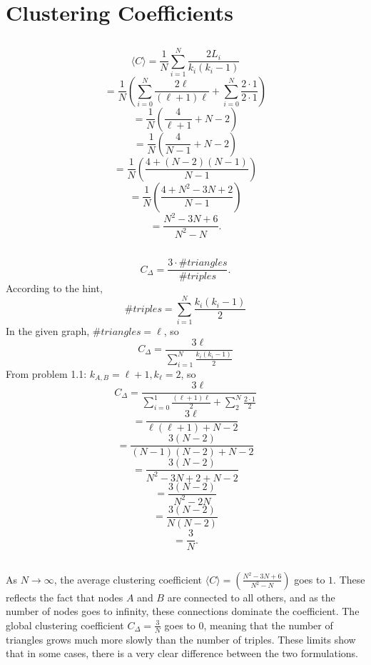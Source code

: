 \documentclass {article}
\begin{document}
\section{Clustering Coefficients}
\subsection{}

$$ \langle C \rangle
= \frac{ 1 }{ N } \sum\limits_{ i=1 }^N \frac{ 2 L_i }{ k_i (k_i - 1) } $$
$$ = \frac{ 1 }{ N } (\sum\limits_{ i=0 }^N \frac{ 2 \ell }{ (\ell + 1) \ell } + \sum\limits_{ i=0 }^N \frac{ 2 \cdot 1 }{ 2 \cdot 1 }) $$
$$ = \frac{ 1 }{ N } (\frac{ 4 }{ \ell + 1 } + N - 2 ) $$
$$ = \frac{ 1 }{ N } (\frac{ 4 }{ N - 1 } + N - 2 ) $$
$$ = \frac{ 1 }{ N } (\frac{ 4 + (N - 2)(N - 1) }{ N - 1 }) $$
$$ = \frac{ 1 }{ N } (\frac{ 4 + N^2 - 3N + 2 }{ N - 1 }) $$
$$ = \frac{ N^2 - 3N + 6 }{ N^2 - N }. $$

\subsection{}
$$ C_{\Delta} = \frac{ 3 \cdot \# triangles }{ \# triples }. $$
According to the hint,
$$ \# triples = \sum\limits_{ i=1 }^N \frac{ k_i (k_i - 1) }{ 2 } $$
In the given graph, $ \# triangles = \ell $, so
$$ C_{\Delta} = \frac{ 3 \ell }{ \sum\limits_{ i=1 }^N \frac{ k_i (k_i - 1) }{ 2 }} $$
From problem 1.1: $ k_{A, B} = \ell + 1, k_{\ell} = 2 $, so
$$ C_{\Delta} = \frac{ 3 \ell }{ \sum\limits_{ i=0 }^1 \frac{ (\ell + 1) \ell }{ 2 } + \sum\limits_{ 2 }^N \frac{ 2 \cdot 1 }{ 2 }} $$
$$ = \frac{ 3 \ell }{ \ell (\ell + 1) + N - 2 } $$
$$ = \frac{ 3 (N - 2) }{ (N-1)(N-2) + N - 2 } $$
$$ = \frac{ 3 (N - 2) }{ N^2 - 3N + 2 + N - 2 } $$
$$ = \frac{ 3 (N - 2) }{ N^2 - 2N } $$
$$ = \frac{ 3 (N - 2) }{ N (N - 2) } $$
$$ = \frac{ 3 }{ N }. $$

\subsection{}
As $ N \to \infty $, the average clustering coefficient $ \langle C \rangle = (\frac{ N^2 - 3N + 6 }{ N^2 - N }) $ goes to $ 1 $. These reflects the fact that nodes $ A $ and $ B $ are connected to all others, and as the number of nodes goes to infinity, these connections dominate the coefficient. The global clustering coefficient $ C_{\Delta} = \frac{ 3 }{ N } $ goes to 0, meaning that the number of triangles grows much more slowly than the number of triples. These limits show that in some cases, there is a very clear difference between the two formulations. 

\newpage
\end{document}
